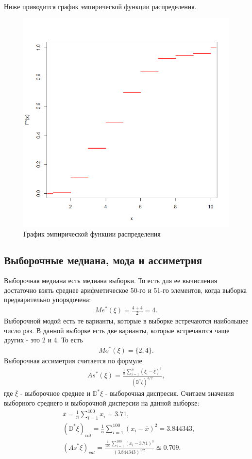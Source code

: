 \documentclass[14pt,a4paper]{scrartcl}
\theoremstyle{definition}
\theoremstyle{remark}
\theoremstyle{definition}
\theoremstyle{definition}
\begin{document}
Ниже приводится график эмпирической функции распределения.

\begin{figure}[H]
  \includegraphics[width=\linewidth]{RPlotDistrFunc1.png}
  \caption{График эмпирической функции распределения}
  \label{fig:image4}
\end{figure}

\subsection{Выборочные медиана, мода и ассиметрия}
Выборочная медиана есть медиана выборки. То есть для ее вычисления достаточно взять среднее арифметическое 50-го и 51-го элементов, когда выборка предварительно упорядочена:
\begin{align*}
  Me^{*}(\xi) = \frac{4 + 4}{2} = 4.
\end{align*}
Выборочной модой есть те варианты, которые в выборке встречаются наибольшее число раз. В данной выборке есть две варианты, которые встречаются чаще других - это 2 и 4. То есть
\begin{align*}
  Mo^{*}(\xi) = \{2, 4\}.
\end{align*}
Выборочная ассиметрия считается по формуле
\begin{align*}
  As^{*}(\xi) = \frac{\frac{1}{n}\sum_{i = 1}^{n} (\xi_i - \overline{\xi})^{3}}{(\mathbb{D}^{*}\xi)^{3/2}},
\end{align*}
где $\overline{\xi}$ - выборочное среднее и $\mathbb{D}^{*}\xi$ - выборочная диспресия.
Считаем значения выборного среднего и выборочной дисперсии на данной выборке:
\begin{align*}
  &\overline{x} = \frac{1}{n} \sum_{i = 1}^{100} x_i = 3.71,\\
  &(\mathbb{D}^{*} \xi)_{val} = \frac{1}{n} \sum_{i = 1}^{100} (x_i - \overline{x})^2 = 3.844343, \\
  &(As^{*} \xi)_{val} = \frac{\frac{1}{100}\sum_{i = 1}^{100} (x_i - 3.71)^{3}}{(3.844343)^{3/2}} \approxeq 0.709.
\end{align*}
\end{document}
